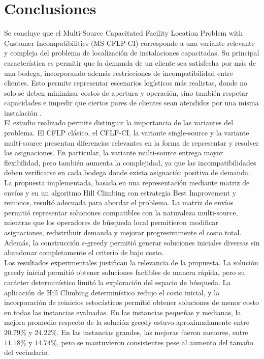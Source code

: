 \section{Conclusiones}

\noindent Se concluye que el Multi-Source Capacitated Facility Location Problem with Customer Incompatibilities (MS-CFLP-CI) corresponde a una variante relevante y compleja del problema de localización de instalaciones capacitadas. Su principal característica es permitir que la demanda de un cliente sea satisfecha por más de una bodega, incorporando además restricciones de incompatibilidad entre clientes. Esto permite representar escenarios logísticos más realistas, donde no solo se deben minimizar costos de apertura y operación, sino también respetar capacidades e impedir que ciertos pares de clientes sean atendidos por una misma instalación \cite{maia2023metaheuristic,ceschia2024multineighborhood}.\\

\noindent El estudio realizado permite distinguir la importancia de las variantes del problema. El CFLP clásico, el CFLP-CI, la variante single-source y la variante multi-source presentan diferencias relevantes en la forma de representar y resolver las asignaciones. En particular, la variante multi-source entrega mayor flexibilidad, pero también aumenta la complejidad, ya que las incompatibilidades deben verificarse en cada bodega donde exista asignación positiva de demanda.\\

\noindent La propuesta implementada, basada en una representación mediante matriz de envíos y en un algoritmo Hill Climbing con estrategia Best Improvement y reinicios, resultó adecuada para abordar el problema. La matriz de envíos permitió representar soluciones compatibles con la naturaleza multi-source, mientras que los operadores de búsqueda local permitieron modificar asignaciones, redistribuir demanda y mejorar progresivamente el costo total. Además, la construcción \(\epsilon\)-greedy permitió generar soluciones iniciales diversas sin abandonar completamente el criterio de bajo costo.\\

\noindent Los resultados experimentales justifican la relevancia de la propuesta. La solución greedy inicial permitió obtener soluciones factibles de manera rápida, pero su carácter determinístico limitó la exploración del espacio de búsqueda. La aplicación de Hill Climbing determinístico redujo el costo inicial, y la incorporación de reinicios estocásticos permitió obtener soluciones de menor costo en todas las instancias evaluadas. En las instancias pequeñas y medianas, la mejora promedio respecto de la solución greedy estuvo aproximadamente entre \(20.79\%\) y \(24.22\%\). En las instancias grandes, las mejoras fueron menores, entre \(11.18\%\) y \(14.74\%\), pero se mantuvieron consistentes pese al aumento del tamaño del vecindario.\\

